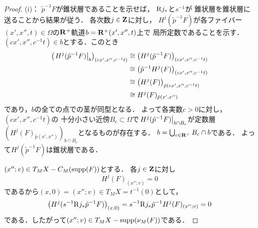 \begin{proof}
    (i)：
    \(\tilde{p}^{-1}F\)が錐状層であることを示せば，
    \(\Rder{j}_{\ast}\)と\(s^{-1}\)が
    錐状層を錐状層に送ることから結果が従う．
    各次数\(j\in \zz\)に対し，
    \(H^{j}(\tilde{p}^{-1}F)\)が各ファイバー\(
        (x',x'',t)\in \varOmega
    \)の\(\rr^{+}\)軌道\(b=\rr^{+}(x',x'',t)\)上で
    局所定数であることを示す．
    \((cx',x'',c^{-1}t)\in b\)とする．このとき
    \begin{align*}
        \left(
            \mres[H^{j}(\tilde{p}^{-1}F)]{b}
        \right)_{(cx',x'',c^{-1}t)}
        &\cong
        \left(
            H^{j}(\tilde{p}^{-1}F)
        \right)_{(cx',x'',c^{-1}t)}\\
        &\cong
        \left(
            \tilde{p}^{-1}H^{j}(F)
        \right)_{(cx',x'',c^{-1}t)}\\
        &\cong
        \left(
            H^{j}(F)
        \right)_{\tilde{p}(cx',x'',c^{-1}t)}\\
        &\cong
        H^{j}(F)_{\tilde{p}(x',x'')}
    \end{align*}
    であり，\(b\)の全ての点での茎が同型となる．
    よって各実数\(c>0\)に対し，\((cx',x'',c^{-1}t)\)の
    十分小さい近傍\(B_c\subset \varOmega\)で\(
        \mres[H^{j}(\tilde{p}^{-1}F)]{b\cap B_c}
    \)が定数層\(\left(
        H^{j}(F)_{\tilde{p}(x',x'')}
    \right)_{b\cap B_c}\)となるものが存在する．
    \(b=\bigcup_{c\in\rr^+}B_{c}\cap b\)である．
    よって\(H^{j}(\tilde{p}^{-1}F)\)は錐状層である．

    \((x'';v)\in T_{M}X-{C_{M}(\supp(F))}\)とする．
    各\(j\in\zz\)に対し
    \[
        H^{j}(F)_{(x'';v)}=0
    \]
    であるから\((x,0)=(x'';v)\in T_{M}X=t^{-1}(0)\)として，
    \begin{align*}
        \left(
            H^{j}(s^{-1}\Rder{j}_{\ast}\tilde{p}^{-1}F)
        \right)_{(x,0)}
        =s^{-1}\Rder{j}_{\ast}\tilde{p}^{-1}H^{j}(F)_{(x'';v)}
        =0
    \end{align*}
    である．したがって\((x'';v)\in T_{M}X-\supp(\nu_{M}(F))\)である．


\end{proof}
